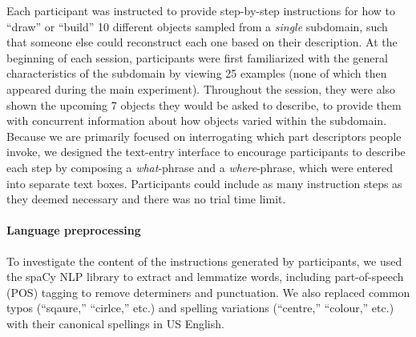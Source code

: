 \documentclass[10pt,letterpaper]{article}
\begin{document}
Each participant was instructed to provide step-by-step instructions for how to ``draw'' or ``build'' 10 different objects sampled from a \textit{single} subdomain, such that someone else could reconstruct each one based on their description.
At the beginning of each session, participants were first familiarized with the general characteristics of the subdomain by viewing 25 examples (none of which then appeared during the main experiment).
Throughout the session, they were also shown the upcoming 7 objects they would be asked to describe, to provide them with concurrent information about how objects varied within the subdomain.
Because we are primarily focused on interrogating which part descriptors people invoke, we designed the text-entry interface to encourage participants to describe each step by composing a \textit{what}-phrase and a \textit{where}-phrase, which were entered into separate text boxes. 
Participants could include as many instruction steps as they deemed necessary and there was no trial time limit.


\paragraph{Language preprocessing} %
To investigate the content of the instructions generated by participants, we used the spaCy NLP library to extract and lemmatize words, including part-of-speech (POS) tagging to remove determiners and punctuation. We also replaced common typos (``sqaure,'' ``cirlce,'' etc.) and spelling variations (``centre,'' ``colour,'' etc.) with their canonical spellings in US English.
\end{document}
